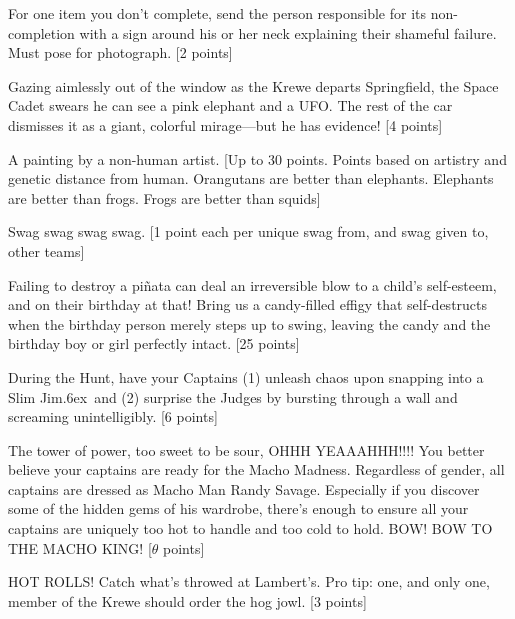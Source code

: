 \documentclass{book}
\def\tr{\raise.6ex\hbox{\scriptsize \textregistered}}
\begin{document}
\begin{list}{}{}
\item For one item you don't complete, send the person responsible for its non-completion with a sign around his or her neck explaining their shameful failure. Must pose for photograph. [2 points]

\item Gazing aimlessly out of the window as the Krewe departs Springfield, the Space Cadet swears he can see a pink elephant and a UFO. The rest of the car dismisses it as a giant, colorful mirage---but he has evidence! [4 points]

\item A painting by a non-human artist. [Up to 30 points. Points based on artistry and genetic distance from human. Orangutans are better than elephants. Elephants are better than frogs. Frogs are better than squids]

\item Swag swag swag swag. [1 point each per unique swag from, and swag given to, other teams]

\item Failing to destroy a pi\~{n}ata can deal an irreversible blow to a child's self-esteem, and on their birthday at that! Bring us a candy-filled effigy that self-destructs when the birthday person merely steps up to swing, leaving the candy and the birthday boy or girl perfectly intact. [25 points]

\item During the Hunt, have your Captains (1) unleash chaos upon snapping into a Slim Jim\tr\ and (2)  surprise the Judges by bursting through a wall and screaming unintelligibly. [6 points]

\item The tower of power, too sweet to be sour, OHHH YEAAAHHH!!!! You better believe your captains are ready for the Macho Madness. Regardless of gender, all captains are dressed as Macho Man Randy Savage. Especially if you discover some of the hidden gems of his wardrobe, there's enough to ensure all your captains are uniquely too hot to handle and too cold to hold. BOW! BOW TO THE MACHO KING! [$\theta$ points] 


\setcounter{items}{113}

\item HOT ROLLS! Catch what's throwed at Lambert's. Pro tip: one, and only one, member of the Krewe should order the hog jowl. [3 points] 



\newpage





\end{list}
\end{document}
